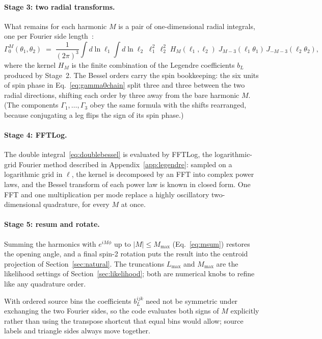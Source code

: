 \documentclass[11pt]{article}
\numberwithin{equation}{section}
\begin{document}
\paragraph{Stage 3: two radial transforms.}
What remains for each harmonic $M$ is a pair of one-dimensional
radial integrals, one per Fourier side length~\cite{fastnc}:
\begin{equation}
  \Gamma_0^{M}(\theta_1, \theta_2)
  \;=\; \frac{1}{(2\pi)^3}
  \int d\ln\ell_1 \int d\ln\ell_2\;
  \ell_1^2\, \ell_2^2\;
  H_M(\ell_1, \ell_2)\;
  J_{M-3}(\ell_1\theta_1)\, J_{-M-3}(\ell_2\theta_2) ,
  \label{eq:doublebessel}
\end{equation}
where the kernel $H_M$ is the finite combination of the Legendre
coefficients $b_L$ produced by Stage~2.  The Bessel orders carry
the spin bookkeeping: the six units of spin phase in
Eq.~\eqref{eq:gamma0chain} split three and three between the two
radial directions, shifting each order by three away from the bare
harmonic $M$.  (The components $\Gamma_1, \ldots, \Gamma_3$ obey
the same formula with the shifts rearranged, because conjugating a
leg flips the sign of its spin phase.)

\paragraph{Stage 4: FFTLog.}
The double integral~\eqref{eq:doublebessel} is evaluated by FFTLog,
the logarithmic-grid Fourier method described in
Appendix~\ref{app:legendre}: sampled on a logarithmic grid in
$\ell$, the kernel is decomposed by an FFT into complex power laws,
and the Bessel transform of each power law is known in closed form.
One FFT and one multiplication per mode replace a highly
oscillatory two-dimensional quadrature, for every $M$ at once.

\paragraph{Stage 5: resum and rotate.}
Summing the harmonics with $e^{iM\phi}$ up to $|M| \le M_{\max}$
(Eq.~\eqref{eq:msum}) restores the opening angle, and a final
spin-2 rotation puts the result into the centroid projection of
Section~\ref{sec:natural}.  The truncations $L_{\max}$ and
$M_{\max}$ are the likelihood settings of
Section~\ref{sec:likelihood}; both are numerical knobs to refine
like any quadrature order.

With ordered source bins the coefficients $b_L^{ijk}$ need not be
symmetric under exchanging the two Fourier sides, so the code
evaluates both signs of $M$ explicitly rather than using the
transpose shortcut that equal bins would allow; source labels and
triangle sides always move together.
\end{document}
